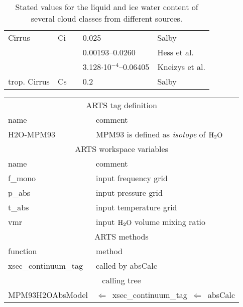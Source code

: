 \begin{table}[!htb]
\begin{center}
\begin{tabular}{lllll}
 Cirrus       & Ci    &              & 0.025 & Salby \cite{salby:96}\\
              &       &              & 0.00193--0.0260 & Hess et al. \cite{hess:98}\\
              &       &              & 3.128$\cdot$10$^{-4}$--0.06405 & Kneizys et al. \cite{abreu:96}\\
 trop. Cirrus & Cs    &              & 0.2   & Salby \cite{salby:96}\\
\hline
\end{tabular}
\caption{Stated values for the liquid and ice water content of several 
  cloud classes from different sources.}
\label{tab:lwc}
\end{center}
\end{table}
%
%
%
\begin{center}
\begin{tabular}{ll}
\hline
\multicolumn{2}{c}{ARTS tag definition}\\
name      & comment \\
H2O-MPM93 & MPM93 is defined as {\it isotope} of $\mbox{H}_2\mbox{O}$\\
\hline
\multicolumn{2}{c}{ARTS workspace variables}\\
name & comment \\
 f\_mono & input frequency grid \\
 p\_abs  & input pressure grid \\
 t\_abs  & input temperature grid\\
 vmr    & input $\mbox{H}_2\mbox{O}$ volume mixing ratio\\
\hline
\multicolumn{2}{c}{ARTS methods}\\
function           & method\\
xsec\_continuum\_tag & called by absCalc \\
\hline
\multicolumn{2}{c}{calling tree}\\
MPM93H2OAbsModel & $\Leftarrow$~xsec\_continuum\_tag~$\Leftarrow$~absCalc\\
\end{tabular}
\end{center}


